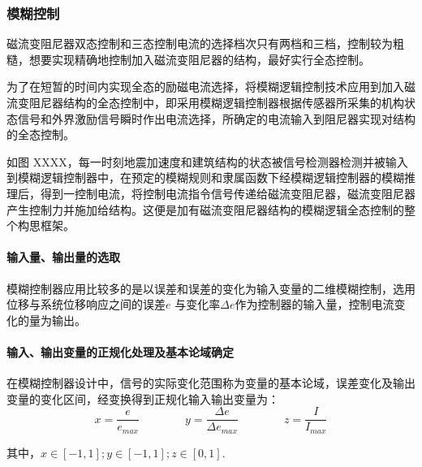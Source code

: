 

\subsubsection{模糊控制}
磁流变阻尼器双态控制和三态控制电流的选择档次只有两档和三档，控制较为粗糙，想要实现精确地控制加入磁流变阻尼器的结构，最好实行全态控制。

为了在短暂的时间内实现全态的励磁电流选择，将模糊逻辑控制技术应用到加入磁流变阻尼器结构的全态控制中，即采用模糊逻辑控制器根据传感器所采集的机构状态信号和外界激励信号瞬时作出电流选择，所确定的电流输入到阻尼器实现对结构的全态控制。

如图 XXXX，每一时刻地震加速度和建筑结构的状态被信号检测器检测并被输入到模糊逻辑控制器中，在预定的模糊规则和隶属函数下经模糊逻辑控制器的模糊推理后，得到一控制电流，将控制电流指令信号传递给磁流变阻尼器，磁流变阻尼器产生控制力并施加给结构。这便是加有磁流变阻尼器结构的模糊逻辑全态控制的整个构思框架。

\paragraph{输入量、输出量的选取}
\qquad 模糊控制器应用比较多的是以误差和误差的变化为输入变量的二维模糊控制，选用位移与系统位移响应之间的误差$e$ 与变化率$\Delta e$作为控制器的输入量，控制电流变化的量为输出。
\paragraph{输入、输出变量的正规化处理及基本论域确定}
\qquad 在模糊控制器设计中，信号的实际变化范围称为变量的基本论域，误差变化及输出变量的变化区间，经变换得到正规化输入输出变量为：
\[x=\frac{e}{e_{max}}\qquad \qquad y=\frac{\Delta e}{\Delta e_{max}}\qquad \qquad z=\frac{I}{I_{max}}\]

其中，$x\in [-1,1]; y\in [-1,1]; z\in [0,1]$.

